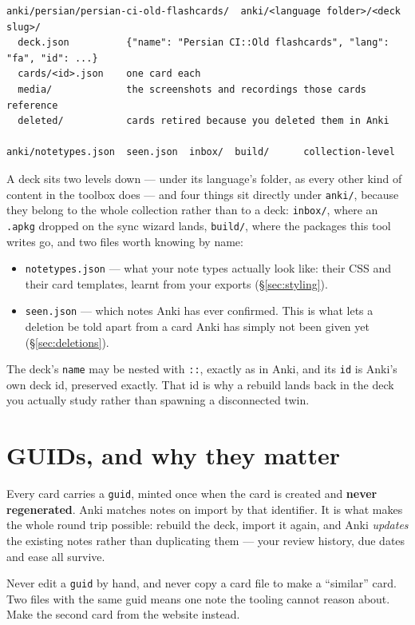 \documentclass[11pt,oneside]{report}
\newcommand{\file}[1]{\texttt{#1}}
\begin{document}
\begin{lstlisting}
anki/persian/persian-ci-old-flashcards/  anki/<language folder>/<deck slug>/
  deck.json          {"name": "Persian CI::Old flashcards", "lang": "fa", "id": ...}
  cards/<id>.json    one card each
  media/             the screenshots and recordings those cards reference
  deleted/           cards retired because you deleted them in Anki

anki/notetypes.json  seen.json  inbox/  build/      collection-level
\end{lstlisting}

A deck sits two levels down --- under its language's folder, as every other
kind of content in the toolbox does --- and four things sit directly under
\file{anki/}, because they belong to the whole collection rather than to a
deck: \file{inbox/}, where an \file{.apkg} dropped on the sync wizard lands,
\file{build/}, where the packages this tool writes go, and two files worth
knowing by name:

\begin{itemize}
\item \file{notetypes.json} --- what your note types actually look like:
  their CSS and their card templates, learnt from your exports
  (\S\ref{sec:styling}).
\item \file{seen.json} --- which notes Anki has ever confirmed. This is what
  lets a deletion be told apart from a card Anki has simply not been given
  yet (\S\ref{sec:deletions}).
\end{itemize}

The deck's \texttt{name} may be nested with \texttt{::}, exactly as in Anki,
and its \texttt{id} is Anki's own deck id, preserved exactly. That id is why
a rebuild lands back in the deck you actually study rather than spawning a
disconnected twin.

\section{GUIDs, and why they matter}

Every card carries a \texttt{guid}, minted once when the card is created and
\textbf{never regenerated}. Anki matches notes on import by that identifier.
It is what makes the whole round trip possible: rebuild the deck, import it
again, and Anki \emph{updates} the existing notes rather than duplicating
them --- your review history, due dates and ease all survive.

\begin{badbox}
Never edit a \texttt{guid} by hand, and never copy a card file to make a
``similar'' card. Two files with the same guid means one note the tooling
cannot reason about. Make the second card from the website instead.
\end{badbox}
\end{document}
